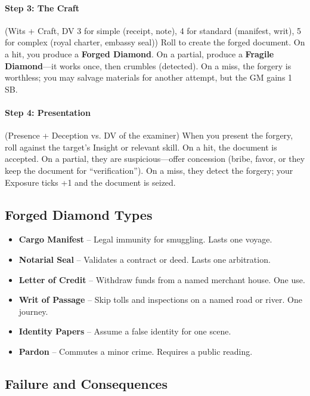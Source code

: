 \documentclass[10pt,twoside]{book}
\begin{document}
\paragraph{Step 3: The Craft} (Wits + Craft, DV 3 for simple (receipt, note), 4 for standard (manifest, writ), 5 for complex (royal charter, embassy seal))  
Roll to create the forged document. On a hit, you produce a \textbf{Forged Diamond}. On a partial, produce a \textbf{Fragile Diamond}---it works once, then crumbles (detected). On a miss, the forgery is worthless; you may salvage materials for another attempt, but the GM gains 1 SB.

\paragraph{Step 4: Presentation} (Presence + Deception vs. DV of the examiner)  
When you present the forgery, roll against the target's Insight or relevant skill. On a hit, the document is accepted. On a partial, they are suspicious---offer concession (bribe, favor, or they keep the document for ``verification''). On a miss, they detect the forgery; your Exposure ticks +1 and the document is seized.

\subsection{Forged Diamond Types}

\begin{itemize}
\item \textbf{Cargo Manifest} -- Legal immunity for smuggling. Lasts one voyage.  
\item \textbf{Notarial Seal} -- Validates a contract or deed. Lasts one arbitration.  
\item \textbf{Letter of Credit} -- Withdraw funds from a named merchant house. One use.  
\item \textbf{Writ of Passage} -- Skip tolls and inspections on a named road or river. One journey.  
\item \textbf{Identity Papers} -- Assume a false identity for one scene.  
\item \textbf{Pardon} -- Commutes a minor crime. Requires a public reading.  
\end{itemize}

\subsection{Failure and Consequences}
\end{document}
